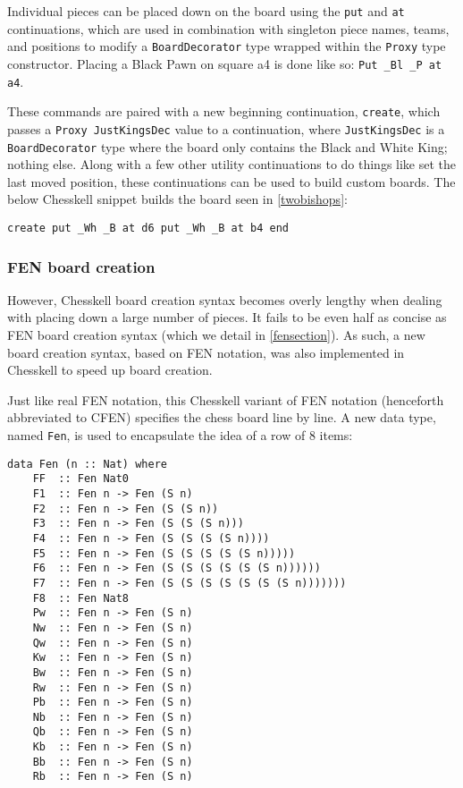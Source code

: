 \documentclass[12pt, a4paper, bibliography=totocnumbered]{scrreprt}
\newcommand{\inline}[1]{\lstinline[basicstyle=\ttfamily\footnotesize]{#1}}
\begin{document}
Individual pieces can be placed down on the board using the \inline{put} and \inline{at} continuations, which are used in combination with singleton piece names, teams, and positions to modify a \inline{BoardDecorator} type wrapped within the \inline{Proxy} type constructor. Placing a Black Pawn on square a4 is done like so: \inline{Put _Bl _P at a4}.

These commands are paired with a new beginning continuation, \inline{create}, which passes a \inline{Proxy JustKingsDec} value to a continuation, where \inline{JustKingsDec} is a \inline{BoardDecorator} type where the board only contains the Black and White King; nothing else. Along with a few other utility continuations to do things like set the last moved position, these continuations can be used to build custom boards. The below Chesskell snippet builds the board seen in \cref{twobishops}:

\begin{lstlisting}
create put _Wh _B at d6 put _Wh _B at b4 end
\end{lstlisting}

\subsubsection{FEN board creation}

However, Chesskell board creation syntax becomes overly lengthy when dealing with placing down a large number of pieces. It fails to be even half as concise as FEN board creation syntax (which we detail in \cref{fensection}). As such, a new board creation syntax, based on FEN notation, was also implemented in Chesskell to speed up board creation.

Just like real FEN notation, this Chesskell variant of FEN notation (henceforth abbreviated to CFEN) specifies the chess board line by line. A new data type, named \inline{Fen}, is used to encapsulate the idea of a row of 8 items:

\begin{lstlisting}
data Fen (n :: Nat) where
    FF  :: Fen Nat0
    F1  :: Fen n -> Fen (S n)
    F2  :: Fen n -> Fen (S (S n))
    F3  :: Fen n -> Fen (S (S (S n)))
    F4  :: Fen n -> Fen (S (S (S (S n))))
    F5  :: Fen n -> Fen (S (S (S (S (S n)))))
    F6  :: Fen n -> Fen (S (S (S (S (S (S n))))))
    F7  :: Fen n -> Fen (S (S (S (S (S (S (S n)))))))
    F8  :: Fen Nat8
    Pw  :: Fen n -> Fen (S n)
    Nw  :: Fen n -> Fen (S n)
    Qw  :: Fen n -> Fen (S n)
    Kw  :: Fen n -> Fen (S n)
    Bw  :: Fen n -> Fen (S n)
    Rw  :: Fen n -> Fen (S n)
    Pb  :: Fen n -> Fen (S n)
    Nb  :: Fen n -> Fen (S n)
    Qb  :: Fen n -> Fen (S n)
    Kb  :: Fen n -> Fen (S n)
    Bb  :: Fen n -> Fen (S n)
    Rb  :: Fen n -> Fen (S n)
\end{lstlisting}
\end{document}
